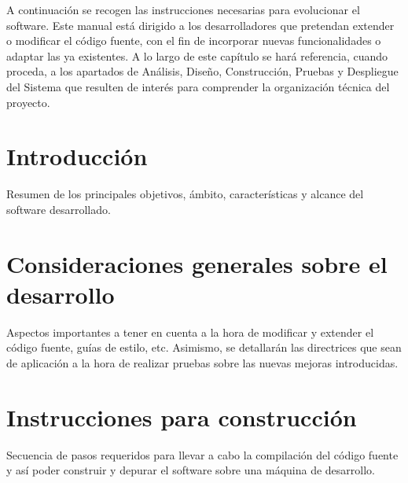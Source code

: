 A continuación se recogen las instrucciones necesarias para evolucionar el software. Este manual está dirigido a los desarrolladores que pretendan extender o modificar el código fuente, con el fin de incorporar nuevas funcionalidades o adaptar las ya existentes. A lo largo de este capítulo se hará referencia, cuando proceda, a los apartados de Análisis, Diseño, Construcción, Pruebas y Despliegue del Sistema que resulten de interés para comprender la organización técnica del proyecto.

\section{Introducción}
Resumen de los principales objetivos, ámbito, características y alcance del software desarrollado.



\section{Consideraciones generales sobre el desarrollo}
Aspectos importantes a tener en cuenta a la hora de modificar y extender el código fuente, guías de estilo, etc. Asimismo, se detallarán las directrices que sean de aplicación a la hora de realizar pruebas sobre las nuevas mejoras introducidas.

\section{Instrucciones para construcción}
Secuencia de pasos requeridos para llevar a cabo la compilación del código fuente y así poder construir y depurar el software sobre una máquina de desarrollo.